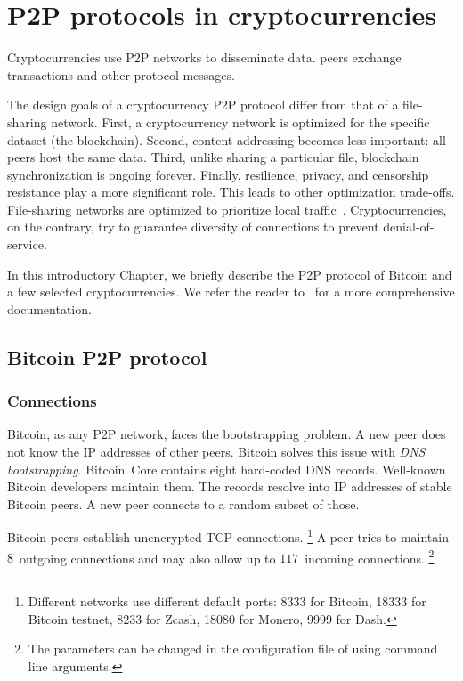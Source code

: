 \chapter{P2P protocols in cryptocurrencies}

\label{Chapter02IntroP2P}

Cryptocurrencies use P2P networks to disseminate data.
peers exchange transactions and other protocol messages.

The design goals of a cryptocurrency P2P protocol differ from that of a file-sharing network.
First, a cryptocurrency network is optimized for the specific dataset (the blockchain).
Second, content addressing becomes less important: all peers host the same data.
Third, unlike sharing a particular file, blockchain synchronization is ongoing forever.
Finally, resilience, privacy, and censorship resistance play a more significant role.
This leads to other optimization trade-offs.
File-sharing networks are optimized to prioritize local traffic~\cite{Yoshida2012,Wang2012}.
Cryptocurrencies, on the contrary, try to guarantee diversity of connections to prevent denial-of-service.

In this introductory Chapter, we briefly describe the P2P protocol of Bitcoin and a few selected cryptocurrencies.
We refer the reader to~\cite{BitcoinWiki, Garay2015} for a more comprehensive documentation.

\section{Bitcoin P2P protocol}

\subsection{Connections}

Bitcoin, as any P2P network, faces the bootstrapping problem.
A new peer does not know the IP addresses of other peers.
Bitcoin solves this issue with \textit{DNS bootstrapping}.
Bitcoin~Core contains eight hard-coded DNS records.
Well-known Bitcoin developers maintain them.
The records resolve into IP addresses of stable Bitcoin peers.
A new peer connects to a random subset of those.

Bitcoin peers establish unencrypted TCP connections.
\footnote{Different networks use different default ports: 8333 for Bitcoin, 18333 for Bitcoin testnet, 8233 for Zcash, 18080 for Monero, 9999 for Dash.}
A peer tries to maintain $8$~outgoing connections and may also allow up to $117$~incoming connections.
\footnote{The parameters can be changed in the configuration file of using command line arguments.}


